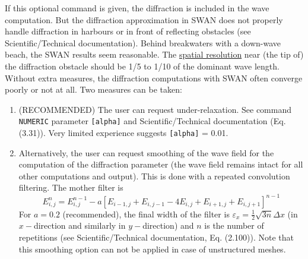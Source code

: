 \documentclass[12pt]{book}
\begin{document}
\noindent
If this optional command is given, the diffraction is included in the wave computation.
But the diffraction approximation in SWAN does not properly handle diffraction in harbours
or in front of reflecting obstacles (see Scientific/Technical documentation). Behind breakwaters with a
down-wave beach, the SWAN results seem reasonable. The \underline{spatial resolution} near (the tip of)
the diffraction obstacle should be 1/5 to 1/10 of the dominant wave length.
\\[2ex]
\noindent
Without extra measures, the diffraction computations with SWAN often converge poorly or not at all. Two
measures can be taken:
\begin{enumerate}
  \item (RECOMMENDED) The user can request under-relaxation. See command {\tt NUMERIC} parameter {\tt [alpha]}
        and Scientific/Technical documentation (Eq. (3.31)). Very limited experience suggests {\tt [alpha]} = 0.01.
  \item Alternatively, the user can request smoothing of the wave field for the computation of the diffraction
        parameter (the wave field remains intact for all other computations and output). This is done with a
        repeated convolution filtering. The mother filter is
        \begin{displaymath}
           E^n_{i,j} = E^{n-1}_{i,j} - a \left[ E_{i-1,j} + E_{i,j-1} -4E_{i,j} + E_{i+1,j} + E_{i,j+1} \right]^{n-1}
        \end{displaymath}
        For $a = 0.2$ (recommended), the final width of the filter is $\varepsilon_x = \frac{1}{2} \sqrt{3n} \Delta x$
        (in $x-$direction and similarly in $y-$direction) and $n$ is the number of repetitions (see Scientific/Technical
        documentation, Eq. (2.100)). Note that this smoothing option can not be applied in case of unstructured meshes.
\end{enumerate}
\end{document}
